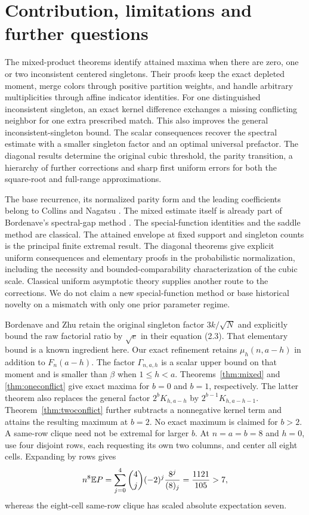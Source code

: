 \section{Contribution, limitations and further questions}

The mixed-product theorems identify attained maxima when there are zero, one or two inconsistent centered singletons. Their proofs keep the exact depleted moment, merge colors through positive partition weights, and handle arbitrary multiplicities through affine indicator identities. For one distinguished inconsistent singleton, an exact kernel difference exchanges a missing conflicting neighbor for one extra prescribed match. This also improves the general inconsistent-singleton bound. The scalar consequences recover the spectral estimate with a smaller singleton factor and an optimal universal prefactor. The diagonal results determine the original cubic threshold, the parity transition, a hierarchy of further corrections and sharp first uniform errors for both the square-root and full-range approximations.

The base recurrence, its normalized parity form and the leading coefficients belong to Collins and Nagatsu \cite{CN}. The mixed estimate itself is already part of Bordenave's spectral-gap method \cite{Bordenave}. The special-function identities and the saddle method are classical. The attained envelope at fixed support and singleton counts is the principal finite extremal result. The diagonal theorems give explicit uniform consequences and elementary proofs in the probabilistic normalization, including the necessity and bounded-comparability characterization of the cubic scale. Classical uniform asymptotic theory supplies another route to the corrections. We do not claim a new special-function method or base historical novelty on a mismatch with only one prior parameter regime.

Bordenave and Zhu \cite[Lemma 2.1]{BZ} retain the original singleton factor $3k/\sqrt N$ and explicitly bound the raw factorial ratio by $\sqrt e$ in their equation (2.3). That elementary bound is a known ingredient here. Our exact refinement retains $\mu_h(n,a-h)$ in addition to $F_n(a-h)$. The factor $\Gamma_{n,a,h}$ is a scalar upper bound on that moment and is smaller than $\beta$ when $1\le h<a$. Theorems~\ref{thm:mixed} and \ref{thm:oneconflict} give exact maxima for $b=0$ and $b=1$, respectively. The latter theorem also replaces the general factor $2^bK_{h,a-h}$ by $2^{b-1}K_{h,a-h-1}$. Theorem~\ref{thm:twoconflict} further subtracts a nonnegative kernel term and attains the resulting maximum at $b=2$. No exact maximum is claimed for $b>2$. A same-row clique need not be extremal for larger $b$. At $n=a=b=8$ and $h=0$, use four disjoint rows, each requesting its own two columns, and center all eight cells. Expanding by rows gives
\[
n^8\mathbb E P=\sum_{j=0}^4\binom4j(-2)^j\frac{8^j}{(8)_j}
=\frac{1121}{105}>7,
\]
whereas the eight-cell same-row clique has scaled absolute expectation seven.

